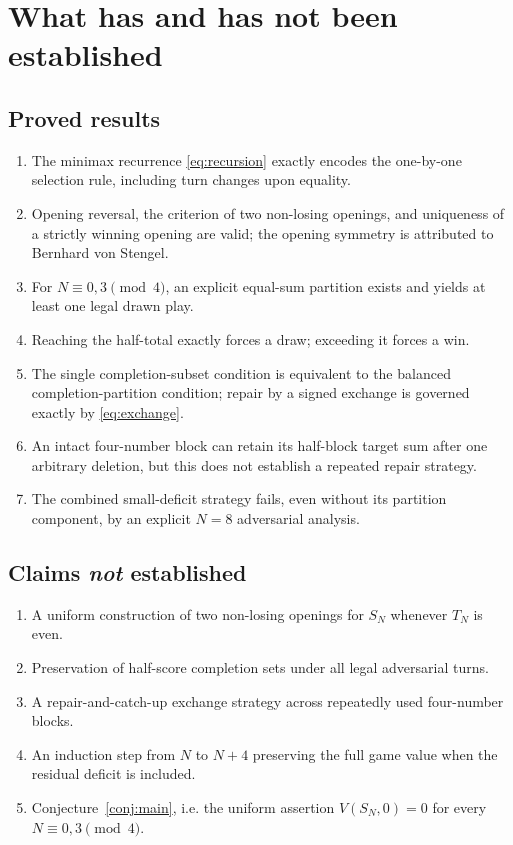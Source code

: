 \documentclass[11pt,a4paper]{article}
\theoremstyle{definition}
\theoremstyle{remark}
\newcommand{\SN}{S_N}
\newcommand{\TN}{T_N}
\begin{document}
\section{What has and has not been established}

\subsection*{Proved results}
\begin{enumerate}[label=\arabic*.]
\item The minimax recurrence \eqref{eq:recursion} exactly encodes the
one-by-one selection rule, including turn changes upon equality.
\item Opening reversal, the criterion of two non-losing openings,
and uniqueness of a strictly winning opening are valid; the opening
symmetry is attributed to Bernhard von Stengel.
\item For $N\equiv0,3\pmod4$, an explicit equal-sum partition exists
and yields at least one legal drawn play.
\item Reaching the half-total exactly forces a draw; exceeding it
forces a win.
\item The single completion-subset condition is equivalent to the
balanced completion-partition condition; repair by a signed exchange
is governed exactly by \eqref{eq:exchange}.
\item An intact four-number block can retain its half-block target
sum after one arbitrary deletion, but this does not establish a
repeated repair strategy.
\item The combined small-deficit strategy fails, even without its
partition component, by an explicit $N=8$ adversarial analysis.
\end{enumerate}

\subsection*{Claims \emph{not} established}
\begin{enumerate}[label=\arabic*.]
\item A uniform construction of two non-losing openings for
$\SN$ whenever $\TN$ is even.
\item Preservation of half-score completion sets under all legal
adversarial turns.
\item A repair-and-catch-up exchange strategy across repeatedly used
four-number blocks.
\item An induction step from $N$ to $N+4$ preserving the full game
value when the residual deficit is included.
\item Conjecture~\ref{conj:main}, i.e. the uniform assertion
$V(\SN,0)=0$ for every $N\equiv0,3\pmod4$.
\end{enumerate}
\end{document}
